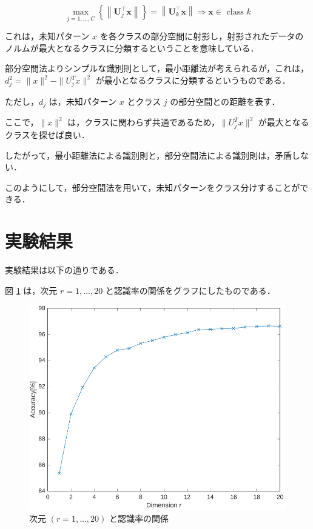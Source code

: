 \documentclass[fleqn, a4paper. 12pt]{jsarticle}
\begin{document}
        \begin{equation}
            \max _{j=1, \ldots, C}\left\{\left\|\mathbf{U}_j^{\top} \boldsymbol{x}\right\|\right\}=\left\|\mathbf{U}_k^{\top} \boldsymbol{x}\right\| \Rightarrow \boldsymbol{x} \in \text { class } k
        \end{equation}

        これは，未知パターン $x$ を各クラスの部分空間に射影し，射影されたデータのノルムが最大となるクラスに分類するということを意味している．

        \quad

        部分空間法よりシンプルな識別則として，最小距離法が考えられるが，これは，$d_j^2 = \|x\|^2 - \|U_j^T x\|^2$ 
        が最小となるクラスに分類するというものである．

        ただし，$d_j$ は，未知パターン $x$ とクラス $j$ の部分空間との距離を表す．

        \quad

        ここで，$\|x\|^2$ は，クラスに関わらず共通であるため，$\|U_j^T x\|^2$ が最大となるクラスを探せば良い．

        したがって，最小距離法による識別則と，部分空間法による識別則は，矛盾しない．

        \quad

        このようにして，部分空間法を用いて，未知パターンをクラス分けすることができる．

  \section{実験結果}

    実験結果は以下の通りである．

    \quad

    図 \ref{fig:1} は，次元 $r = 1, \dots, 20$ と認識率の関係をグラフにしたものである．

    \begin{figure}[p]
      \centering
      \includegraphics[width=1\textwidth]{fig_0.pdf}
      \caption{次元 $(r = 1, \dots, 20)$ と認識率の関係}
      \label{fig:1}
    \end{figure}
\end{document}
